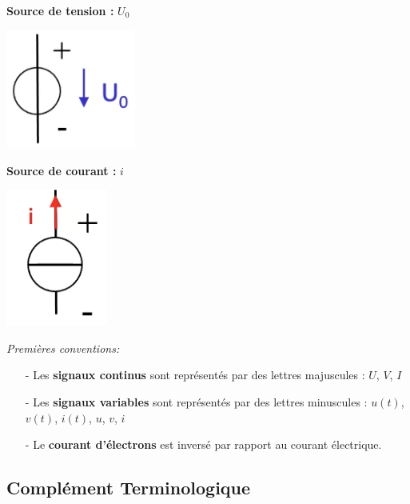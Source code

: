 \vspace{10px}
\begin{minipage}[htp]{0.45\textwidth}
    \textbf{Source de tension :} $U_0$ \\
    \begin{center}
        \includegraphics[width=0.32\textwidth]{chapters/chapter1/images/source_tension.png}
    \end{center}
\end{minipage}
\hfill
\vline
\hfill
\begin{minipage}[htp]{0.45\textwidth}
    \textbf{Source de courant :} $i$ \\
    \begin{center}
        \includegraphics[width=0.25\textwidth]{chapters/chapter1/images/source_courant.png}
    \end{center}
\end{minipage}

\textit{Premières conventions: } \\
\begin{itemize}
    \item[-] Les \textbf{signaux continus} sont représentés par des lettres majuscules : $U$, $V$, $I$
    \item[-] Les \textbf{signaux variables} sont représentés par des lettres minuscules : $u(t)$, $v(t)$, $i(t)$, $u$, $v$, $i$
    \item[-] Le \textbf{courant d'électrons} est inversé par rapport au courant électrique.
\end{itemize}

\subsection{Complément Terminologique}

